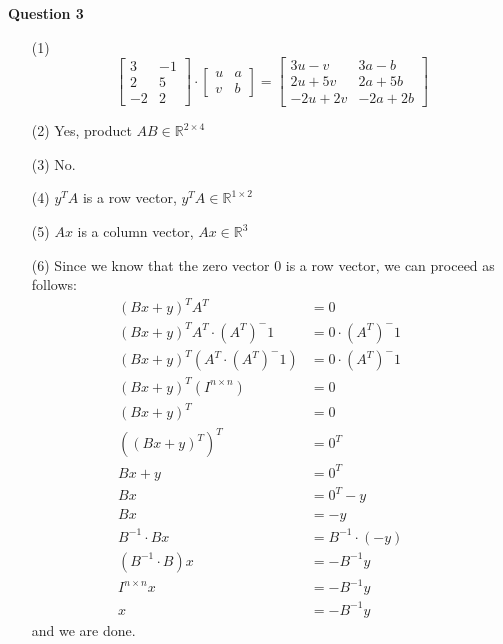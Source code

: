 \documentclass[12pt]{article} %
\newcommand{\R}{\mathbb{R}}
\begin{document}
\begin{flushleft}
\vspace{1cm}

\textbf{Question 3} 
\begin{enumerate}
	\item[(1)]
		\[
		\left[
			{\begin{array}{cc}
		   		3 & -1 \\
				2 & 5 \\
				-2 & 2
		  \end{array} } 
		\right]
		\cdot
		\left[
			{\begin{array}{cc}
		   		u & a \\
				v & b
		  \end{array} } 
		\right]
		=
		\left[
			{\begin{array}{cc}
		   		3u - v & 3a - b \\
				2u + 5v & 2a+5b \\
				-2u + 2v & -2a + 2b
		  \end{array} } 
		\right]
		\]
	\item[(2)] Yes, product $AB \in \R^{2\times4}$
	\item[(3)] No.
	\item[(4)]	 $y^TA$ is a row vector, $y^TA \in \R^{1\times2}$
	\item[(5)] $Ax$ is a column vector, $Ax \in \R^3$
	\item[(6)] Since we know that the zero vector $0$ is a row vector, we can proceed as follows:
		\begin{align*}
			(Bx + y)^TA^T &= 0 &&\\
			(Bx + y)^TA^T\cdot (A^T)^-1 &= 0\cdot(A^T)^-1 &&\\
			(Bx + y)^T(A^T\cdot (A^T)^-1) &= 0\cdot(A^T)^-1 &&\\
			(Bx + y)^T(I^{n\times n}) &= 0 &&\\
			(Bx + y)^T &= 0 &&\\
			((Bx + y)^T)^T &= 0^T &&\\
			Bx + y &= 0^T &&\\
			Bx &= 0^T - y &&\\
			Bx &= -y &&\\
			B^{-1}\cdot Bx &= B^{-1}\cdot(-y) &&\\
			(B^{-1}\cdot B)x &= -B^{-1}y &&\\
			I^{n\times n}x &= -B^{-1}y &&\\
			x &= -B^{-1}y
		\end{align*}
	and we are done.
\end{enumerate}


\end{flushleft}
\end{document}
